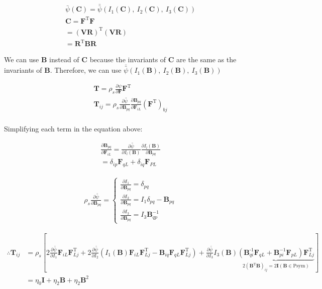 \begin{problem}
\begin{enumerate}
\begin{align}
\bar{\psi}(\mathbf{C})=\bar{\bar{\psi}}(I_{1}(\mathbf{C}),\ I_{2}(\mathbf{C}),\ I_{3}(\mathbf{C})) \\
\mathbf{C}=\mathbf{F}^{\text{T}}\mathbf{F} \\
=(\mathbf{V}\mathbf{R})^{\text{T}}(\mathbf{V}\mathbf{R}) \\
=\mathbf{R}^{\text{T}}\mathbf{B}\mathbf{R}
\end{align}

We can use $\mathbf{B}$ instead of $\mathbf{C}$ because the invariants of $\mathbf{C}$ are the same as the invariants of $\mathbf{B}$.
Therefore, we can use $\bar{\bar{\psi}}(I_{1}(\mathbf{B}),\ I_{2}(\mathbf{B}),\ I_{3}(\mathbf{B}))$


\begin{align}
\mathbf{T}=\rho_{s}\frac{ \partial \psi }{ \partial \mathbf{F} } \mathbf{F}^{\text{T}} \\
\mathbf{T}_{ij}=\rho_{s}\frac{ \partial \bar{\bar{\psi}} }{ \partial \mathbf{B}_{pq} } \frac{ \partial \mathbf{B}_{pq} }{ \partial \mathbf{F}_{iL} } (\mathbf{F}^{\text{T}})_{bj} \\
\end{align}


Simplifying each term in the equation above:


\begin{align}
\frac{ \partial \mathbf{B}_{pq} }{ \partial \mathbf{F}_{iL} }=\frac{ \partial \bar{\bar{\psi}} }{ \partial I_{l} (\mathbf{B})}\frac{ \partial I_{l}(\mathbf{B}) }{ \partial \mathbf{\mathbf{B}}_{pq} }   \\
=\delta_{ip}\mathbf{F}_{qL}+\delta_{iq}\mathbf{F}_{PL}
\end{align}

\begin{align}
\rho_{s}\frac{ \partial \bar{\bar{\psi}} }{ \partial \mathbf{B}_{pq} }=\begin{cases}
\frac{ \partial I_{1} }{ \partial \mathbf{B}_{pq} } =\delta_{pq} \\
\frac{ \partial I_{2} }{ \partial \mathbf{B}_{pq} } =I_{1}\delta_{pq}-\mathbf{B}_{pq} \\
\frac{ \partial I_{3} }{ \partial \mathbf{B}_{pq} } =I_{3}\mathbf{B}_{qp}^{-1}
\end{cases}
\end{align}


\begin{align}
\therefore \mathbf{T}_{ij}&=\rho_{s}\left[ 2\frac{ \partial \bar{\bar{\psi}} }{ \partial I_{1} }  \mathbf{F}_{iL}\mathbf{F}_{Lj}^{\text{T}}+2\frac{ \partial \bar{\bar{\psi}} }{ \partial I_{2} }(I_{1}(\mathbf{B})\mathbf{F}_{iL}\mathbf{F}^{\text{T}}_{Lj}-\mathbf{B}_{iq}\mathbf{F}_{qL}\mathbf{F}_{Lj}^{\text{T}})+\frac{ \partial \bar{\bar{\psi}} }{ \partial I_{3} }I_{3}(\mathbf{B})\underbrace{ (\mathbf{B}^{\text{-1}}_{qi}\mathbf{F}_{qL}+\mathbf{B}_{pi}^{-1}\mathbf{F}_{pL})\mathbf{F}^{\text{T}}_{Lj} }_{ 2(\mathbf{B}^{\text{T}}\mathbf{B})_{ij}=2\mathbf{I}(\mathbf{B}\in \text{Psym}) }\right] \\
&=\eta_{0}\mathbf{I}+\eta_{2}\mathbf{B}+\eta_{2}\mathbf{\mathbf{B}}^2
\end{align}



\end{enumerate}
\end{problem}
